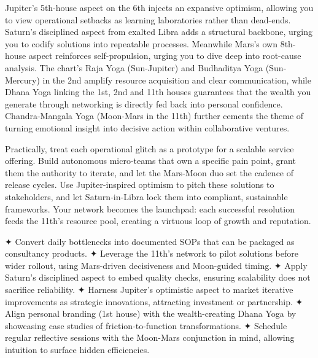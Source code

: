 {\fontsize{9}{13}\selectfont Jupiter's 5th-house aspect on the 6th injects an expansive optimism, allowing you to view operational setbacks as learning laboratories rather than dead-ends. Saturn's disciplined aspect from exalted Libra adds a structural backbone, urging you to codify solutions into repeatable processes. Meanwhile Mars's own 8th-house aspect reinforces self-propulsion, urging you to dive deep into root-cause analysis. The chart's Raja Yoga (Sun-Jupiter) and Budhaditya Yoga (Sun-Mercury) in the 2nd amplify resource acquisition and clear communication, while Dhana Yoga linking the 1st, 2nd and 11th houses guarantees that the wealth you generate through networking is directly fed back into personal confidence. Chandra-Mangala Yoga (Moon-Mars in the 11th) further cements the theme of turning emotional insight into decisive action within collaborative ventures.}\par\vspace{1.8mm}

{\fontsize{9}{13}\selectfont Practically, treat each operational glitch as a prototype for a scalable service offering. Build autonomous micro-teams that own a specific pain point, grant them the authority to iterate, and let the Mars-Moon duo set the cadence of release cycles. Use Jupiter-inspired optimism to pitch these solutions to stakeholders, and let Saturn-in-Libra lock them into compliant, sustainable frameworks. Your network becomes the launchpad: each successful resolution feeds the 11th's resource pool, creating a virtuous loop of growth and reputation.}\par\vspace{1.8mm}

{\fontsize{9}{13}\selectfont ✦ Convert daily bottlenecks into documented SOPs that can be packaged as consultancy products. ✦ Leverage the 11th's network to pilot solutions before wider rollout, using Mars-driven decisiveness and Moon-guided timing. ✦ Apply Saturn's disciplined aspect to embed quality checks, ensuring scalability does not sacrifice reliability. ✦ Harness Jupiter's optimistic aspect to market iterative improvements as strategic innovations, attracting investment or partnership. ✦ Align personal branding (1st house) with the wealth-creating Dhana Yoga by showcasing case studies of friction-to-function transformations. ✦ Schedule regular reflective sessions with the Moon-Mars conjunction in mind, allowing intuition to surface hidden efficiencies.}\par\vspace{1.8mm}

